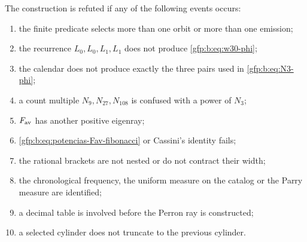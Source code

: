 \begin{remark}
The construction is refuted if any of the following events occurs:
\begin{enumerate}
 \setlength{\itemsep}{0.15\baselineskip}
 \item the finite predicate selects more than one orbit or more than one emission;
 \item the recurrence \(L_0,L_0,L_1,L_1\) does not produce
       \eqref{gfp:b:eq:w30-phi};
 \item the calendar does not produce exactly the three pairs used in
       \eqref{gfp:b:eq:N3-phi};
 \item a count multiple \(N_{9},N_{27},N_{108}\) is confused with a
       power of \(N_3\);
 \item \(F_{\rm av}\) has another positive eigenray;
 \item \eqref{gfp:b:eq:potencias-Fav-fibonacci} or Cassini’s identity fails;
 \item the rational brackets are not nested or do not contract their width;
 \item the chronological frequency, the uniform measure on the
       catalog or the Parry measure are identified;
 \item a decimal table is involved before the Perron ray is constructed;
 \item a selected cylinder does not truncate to the previous cylinder.
\end{enumerate}
\end{remark}
